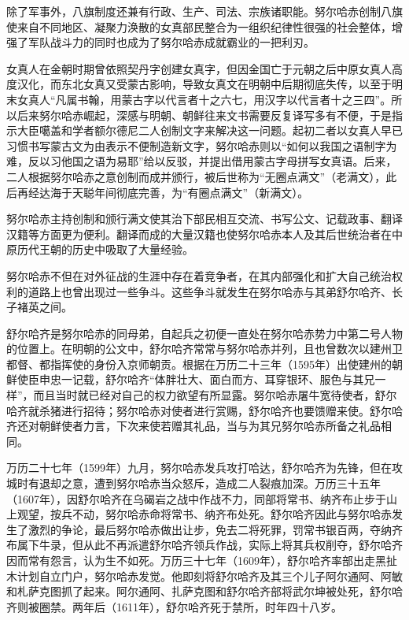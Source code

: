 除了军事外，八旗制度还兼有行政、生产、司法、宗族诸职能。努尔哈赤创制八旗使来自不同地区、凝聚力涣散的女真部民整合为一组织纪律性很强的社会整体，增强了军队战斗力的同时也成为了努尔哈赤成就霸业的一把利刃。

女真人在金朝时期曾依照契丹字创建女真字，但因金国亡于元朝之后中原女真人高度汉化，而东北女真又受蒙古影响，导致女真文在明朝中后期彻底失传，以至于明末女真人“凡属书翰，用蒙古字以代言者十之六七，用汉字以代言者十之三四”。所以后来努尔哈赤崛起，深感与明朝、朝鲜往来文书需要反复译写多有不便，于是指示大臣噶盖和学者额尔德尼二人创制文字来解决这一问题。起初二者以女真人早已习惯书写蒙古文为由表示不便制造新文字，努尔哈赤则以“如何以我国之语制字为难，反以习他国之语为易耶”给以反驳，并提出借用蒙古字母拼写女真语。后来，二人根据努尔哈赤之意创制而成并颁行，被后世称为“无圈点满文”（老满文），此后再经达海于天聪年间彻底完善，为“有圈点满文”（新满文）。

努尔哈赤主持创制和颁行满文使其治下部民相互交流、书写公文、记载政事、翻译汉籍等方面更为便利。翻译而成的大量汉籍也使努尔哈赤本人及其后世统治者在中原历代王朝的历史中吸取了大量经验。

努尔哈赤不但在对外征战的生涯中存在着竞争者，在其内部强化和扩大自己统治权利的道路上也曾出现过一些争斗。这些争斗就发生在努尔哈赤与其弟舒尔哈齐、长子褚英之间。

舒尔哈齐是努尔哈赤的同母弟，自起兵之初便一直处在努尔哈赤势力中第二号人物的位置上。在明朝的公文中，舒尔哈齐常常与努尔哈赤并列，且也曾数次以建州卫都督、都指挥使的身份入京师朝贡。根据在万历二十三年（1595年）出使建州的朝鲜使臣申忠一记载，舒尔哈齐“体胖壮大、面白而方、耳穿银环、服色与其兄一样”，而且当时就已经对自己的权力欲望有所显露。努尔哈赤屠牛宽待使者，舒尔哈齐就杀猪进行招待；努尔哈赤对使者进行赏赐，舒尔哈齐也要馈赠来使。舒尔哈齐还对朝鲜使者力言，下次来使若赠其礼品，当与为其兄努尔哈赤所备之礼品相同。

万历二十七年（1599年）九月，努尔哈赤发兵攻打哈达，舒尔哈齐为先锋，但在攻城时有退却之意，遭到努尔哈赤当众怒斥，造成二人裂痕加深。万历三十五年（1607年），因舒尔哈齐在乌碣岩之战中作战不力，同部将常书、纳齐布止步于山上观望，按兵不动，努尔哈赤命将常书、纳齐布处死。舒尔哈齐因此与努尔哈赤发生了激烈的争论，最后努尔哈赤做出让步，免去二将死罪，罚常书银百两，夺纳齐布属下牛录，但从此不再派遣舒尔哈齐领兵作战，实际上将其兵权削夺，舒尔哈齐因而常有怨言，认为生不如死。万历三十七年（1609年），舒尔哈齐率部出走黑扯木计划自立门户，努尔哈赤发觉。他即刻将舒尔哈齐及其三个儿子阿尔通阿、阿敏和札萨克图抓了起来。阿尔通阿、扎萨克图和舒尔哈齐部将武尔坤被处死，舒尔哈齐则被圈禁。两年后（1611年），舒尔哈齐死于禁所，时年四十八岁。

